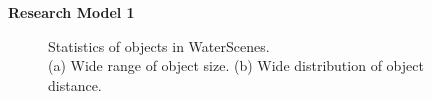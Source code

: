 \documentclass[final]{beamer}
\newlength{\colwidthB}
\begin{document}
\begin{frame}[t]
\begin{columns}
\begin{column}[T]{\colwidthB}
\begin{block}{\Large{\textbf{Research Model 1}}}
\begin{figure}[h]
\centering
{}
\quad
\hspace{-6mm}
\captionsetup{justification=centering} 
\caption{Statistics of objects in WaterScenes. \protect\\(a) Wide range of object size. (b) Wide distribution of object distance.}
\label{fig:statistics}
\end{figure}

\vspace{-0.2cm}


\end{block}
\end{column}
\end{columns}
\end{frame}
\end{document}
